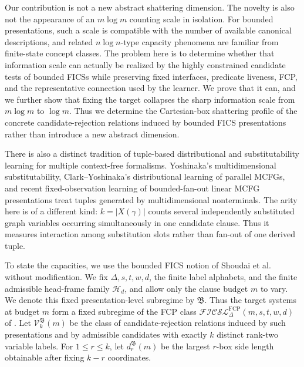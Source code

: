 \documentclass[11pt]{article}
\theoremstyle{definition}
\theoremstyle{remark}
\begin{document}
Our contribution is not a new abstract shattering dimension.  The novelty is
also not the appearance of an \(m\log m\) counting scale in isolation.  For
bounded presentations, such a scale is compatible with the number of available
canonical descriptions, and related \(n\log n\)-type capacity phenomena are
familiar from finite-state concept classes.  The problem here is to determine
whether that information scale can actually be realized by the highly
constrained candidate tests of bounded FICSs while preserving fixed
interfaces, predicate liveness, FCP, and the representative connection used by
the learner.  We prove that it can, and we further show that fixing the target
collapses the sharp information scale from \(m\log m\) to \(\log m\).  Thus we
determine the Cartesian-box shattering profile of the concrete
candidate-rejection relations induced by bounded FICS presentations rather
than introduce a new abstract dimension.

There is also a distinct tradition of tuple-based distributional and
substitutability learning for multiple context-free formalisms.  Yoshinaka's
multidimensional substitutability, Clark--Yoshinaka's distributional learning
of parallel MCFGs, and recent fixed-observation learning of bounded-fan-out
linear MCFG presentations
\cite{Yoshinaka2011,ClarkYoshinaka2014,KuriyamaFixedObservationMCFG}
treat tuples generated by multidimensional nonterminals.  The arity here is of
a different kind: \(k=|X(\gamma)|\) counts several independently substituted
graph variables occurring simultaneously in one candidate clause.  Thus it
measures interaction among substitution slots rather than fan-out of one
derived tuple.

To state the capacities, we use the bounded FICS notion of
Shoudai et al.~\cite{ShoudaiEtAl2026} without modification.  We fix
\(\Delta,s,t,w,d\), the finite label alphabets, and the finite admissible
head-frame family \(\mathcal H_d\), and allow only the clause budget \(m\) to
vary.  We denote this fixed presentation-level subregime by \(\mathfrak B\).
Thus the target systems at budget \(m\) form a fixed subregime of the FCP
class \(\mathcal{FICSL}^{\mathrm{FCP}}_{\Delta}(m,s,t,w,d)\) of
\cite{ShoudaiEtAl2026}.  Let \(\mathcal V_k^{\mathfrak B}(m)\) be the class
of candidate-rejection relations induced by such presentations and by
admissible candidates with exactly \(k\) distinct rank-two variable labels.
For \(1\le r\le k\), let \(d_r^{\mathfrak B}(m)\) be the largest
\(r\)-box side length obtainable after fixing \(k-r\) coordinates.
\end{document}
